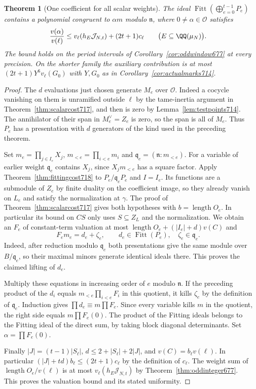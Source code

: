 \documentclass[a4paper,11pt]{article}
\newtheorem{theorem}[proposition]{Theorem}
\theoremstyle{definition}
\theoremstyle{remark}
\newcommand{\len}{\operatorname{length}}\newcommand{\Res}{\operatorname*{Res}}
\numberwithin{equation}{section}
\begin{document}
\begin{theorem}[One coefficient for all scalar weights]
\leavevmode\label{thm:allscalarfit718}
The ideal \(\operatorname{Fitt}(\bigoplus_{e=0}^{t-1}P_e)\)
contains a polynomial congruent to \(\alpha m\) modulo
\(\mathfrak n\), where \(0\ne\alpha\in\mathcal O\) satisfies
\[
 \frac{v(\alpha)}{v(\ell)}
       \le v_\ell(h_E\mathcal J_{N,t})+(2t+1)c_\ell
        \qquad\bigl(E\subseteq\QQ(\mu_N)\bigr).
\]
The bound holds on the period intervals of
Corollary~\ref{cor:oddwindow677} at every precision. On the
shorter family the auxiliary contribution is at most
\((2t+1)Y^6v_\ell(G_0)\) with \(Y,G_0\) as in
Corollary~\ref{cor:actualmarks714}.
\end{theorem}
\begin{proof}
The \(d\) evaluations just chosen generate \(M_e\) over
\(\mathcal O\). Indeed a cocycle vanishing on them is unramified
outside \(\ell\) by the tame-inertia argument in
Theorem~\ref{thm:scalarcost717}, and then is zero by
Lemma~\ref{lem:testpoints714}. The annihilator of their span
in \(M_e^\vee=Z_e\) is zero, so the span is all of \(M_e\).
Thus \(P_e\) has a presentation with \(d\) generators of the
kind used in the preceding theorem.

Set \(m_e=\prod_{j\in I_e}X_j\), \(m_{<e}=\prod_{i<e}m_i\)
and \(\mathfrak q_e=(\mathfrak n:m_{<e})\).
For a variable of earlier weight \(\mathfrak q_e\) contains
\(X_j\), since \(X_j m_{<e}\) has a square factor. Apply
Theorem~\ref{thm:fittingcost718} to \(P_e/\mathfrak q_eP_e\)
and \(I=I_e\). Its functions are a submodule of \(Z_e\) by
finite duality on the coefficient image, so they already
vanish on \(L_e\) and satisfy the normalization at \(\gamma\).
The proof of Theorem~\ref{thm:scalarcost717} gives both
hypotheses with \(b=\len O_e\). In particular its bound on
\(CS\) only uses \(S\subseteq Z_L\) and the normalization.
We obtain an \(F_e\) of constant-term valuation at most
\(\len O_e+(|I_e|+d)v(C)\) and
\[
           F_e m_e=d_e+\zeta_e,\qquad
           d_e\in\operatorname{Fitt}(P_e),\quad
           \zeta_e\in\mathfrak q_e .
\]
Indeed, after reduction modulo \(\mathfrak q_e\) both presentations
give the same module over \(B/\mathfrak q_e\), so their
maximal minors generate identical ideals there. This proves the
claimed lifting of \(d_e\).

Multiply these equations in increasing order of \(e\) modulo
\(\mathfrak n\). If the preceding product of the \(d_i\) equals
\(m_{<e}\prod_{i<e}F_i\) in this quotient, it kills
\(\zeta_e\) by the definition of \(\mathfrak q_e\).
Induction gives \(\prod d_e\equiv m\prod F_e\).
Since every variable kills \(m\) in the quotient, the right
side equals \(m\prod F_e(0)\). The product of the Fitting
ideals belongs to the Fitting ideal of the direct sum, by
taking block diagonal determinants. Set \(\alpha=\prod F_e(0)\).

Finally \(|J|=(t-1)|S_\ell|\),
\(d\le 2+|S_\ell|+2|J|\), and \(v(C)=b_\ell v(\ell)\).
In particular \((|J|+td)b_\ell\le(2t+1)c_\ell\) by the
definition of \(c_\ell\). The weight sum of
\(\len O_e/v(\ell)\) is at most \(v_\ell(h_E\mathcal J_{N,t})\)
by Theorem~\ref{thm:oddinteger677}. This proves the valuation
bound and its stated uniformity.
\end{proof}
\end{document}
